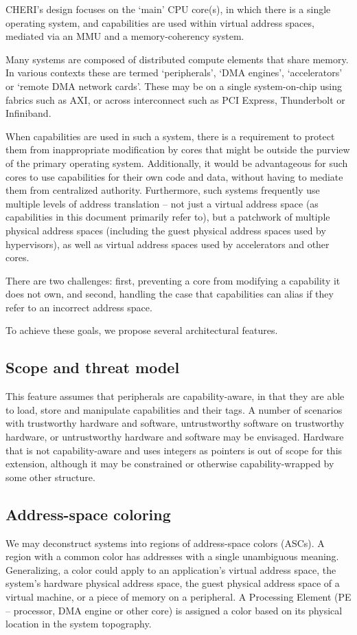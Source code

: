 CHERI's design focuses on the `main' CPU core(s), in which there is a single operating system, and capabilities are used within virtual address spaces, mediated via an MMU and a memory-coherency system.

Many systems are composed of distributed compute elements that share memory.  In various contexts these are termed `peripherals', `DMA engines', `accelerators' or `remote DMA network cards'.  These may be on a single system-on-chip using fabrics such as AXI, or across interconnect such as PCI Express, Thunderbolt or Infiniband.

When capabilities are used in such a system, there is a requirement to
protect them from inappropriate modification by cores that might be outside the purview of the primary operating system.  Additionally, it would be advantageous for such cores to use capabilities for their own code and data, without having to mediate them from centralized authority.  Furthermore, such systems frequently use multiple levels of address translation -- not just a virtual address space (as capabilities in this document primarily refer to), but a patchwork of multiple physical address spaces (including the guest physical address spaces used by hypervisors), as well as virtual address spaces used by accelerators and other cores.

There are two challenges: first, preventing a core from modifying a
capability it does not own, and second, handling the case that capabilities
can alias if they refer to an incorrect address space.

To achieve these goals, we propose several architectural features.

\subsection{Scope and threat model}
This feature assumes that peripherals are capability-aware, in that they are able to load, store and manipulate capabilities and their tags.  A number of scenarios with trustworthy hardware and software, untrustworthy software on trustworthy hardware, or untrustworthy hardware and software may be envisaged.  Hardware that is not capability-aware and uses integers as pointers is out of scope for this extension, although it may be constrained or otherwise capability-wrapped by some other structure.

\subsection{Address-space coloring}
\label{app:exp:coloring}
We may deconstruct systems into regions of address-space colors (ASCs).  A region with a common color has addresses with a single unambiguous meaning.  Generalizing, a color could apply to an application's virtual address space, the system's hardware physical address space, the guest physical address space of a virtual machine, or a piece of memory on a peripheral.
A Processing Element (PE -- processor, DMA engine or other core) is assigned a color based on its physical location in the system topography.

